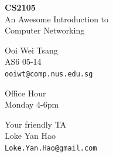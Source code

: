 \begin{frame}
\begin{center}
\textbf{
\Huge
CS2105\\[10pt]
	}
\large
An Awesome Introduction to\\ Computer Networking
\end{center}
\end{frame}


\begin{frame}
\begin{center}
\large
Ooi Wei Tsang\\
AS6 05-14\\
\large
\texttt{ooiwt@comp.nus.edu.sg}\\
\end{center}
\end{frame}

\begin{frame}
\begin{center}
\large
Office Hour\\
\large
Monday 4-6pm
\end{center}
\end{frame}

\begin{frame}
\begin{center}
\large
Your friendly TA\\
\large
Loke Yan Hao\\
\large
\texttt{Loke.Yan.Hao@gmail.com}\\
\end{center}
\end{frame}

